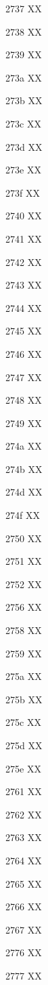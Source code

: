 \documentclass[11pt]{article}
\begin{document}
2737 X{}X

2738 X{}X

2739 X{}X

273a X{}X

273b X{}X

273c X{}X

273d X{}X

273e X{}X

273f X{}X

2740 X{}X

2741 X{}X

2742 X{}X

2743 X{}X

2744 X{}X

2745 X{}X

2746 X{}X

2747 X{}X

2748 X{}X

2749 X{}X

274a X{}X

274b X{}X

274d X{}X

274f X{}X

2750 X{}X

2751 X{}X

2752 X{}X

2756 X{}X

2758 X{}X

2759 X{}X

275a X{}X

275b X{}X

275c X{}X

275d X{}X

275e X{}X

2761 X{}X

2762 X{}X

2763 X{}X

2764 X{}X

2765 X{}X

2766 X{}X

2767 X{}X

2776 X{}X

2777 X{}X
\end{document}
